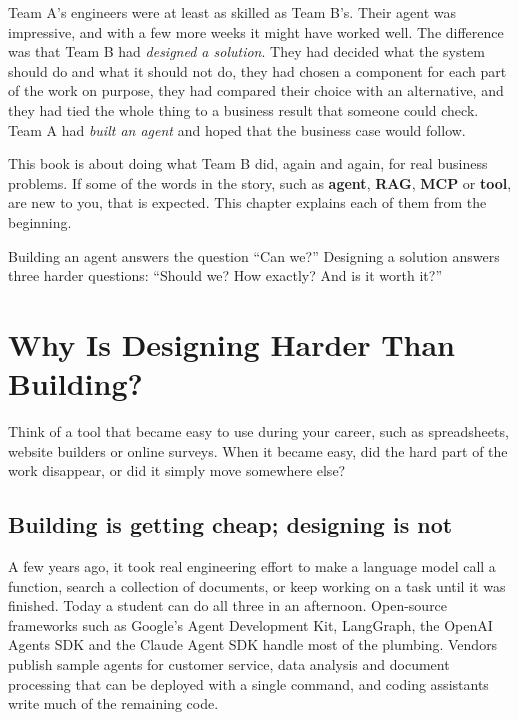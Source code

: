 Team A's engineers were at least as skilled as Team B's. Their agent was impressive, and with a few more weeks it might have worked well. The difference was that Team B had \emph{designed a solution}. They had decided what the system should do and what it should not do, they had chosen a component for each part of the work on purpose, they had compared their choice with an alternative, and they had tied the whole thing to a business result that someone could check. Team A had \emph{built an agent} and hoped that the business case would follow.

This book is about doing what Team B did, again and again, for real business problems. If some of the words in the story, such as \textbf{agent}, \textbf{RAG}, \textbf{MCP} or \textbf{tool}, are new to you, that is expected. This chapter explains each of them from the beginning.

\begin{keyidea}
Building an agent answers the question ``Can we?'' Designing a solution answers three harder questions: ``Should we? How exactly? And is it worth it?''
\end{keyidea}

\section{Why Is Designing Harder Than Building?}
\label{sec:design-gap}

\begin{thinkabout}
Think of a tool that became easy to use during your career, such as spreadsheets, website builders or online surveys. When it became easy, did the hard part of the work disappear, or did it simply move somewhere else?
\end{thinkabout}

\subsection{Building is getting cheap; designing is not}

A few years ago, it took real engineering effort to make a language model call a function, search a collection of documents, or keep working on a task until it was finished. Today a student can do all three in an afternoon. Open-source frameworks such as Google's Agent Development Kit, LangGraph, the OpenAI Agents SDK and the Claude Agent SDK handle most of the plumbing. Vendors publish sample agents for customer service, data analysis and document processing that can be deployed with a single command, and coding assistants write much of the remaining code.


